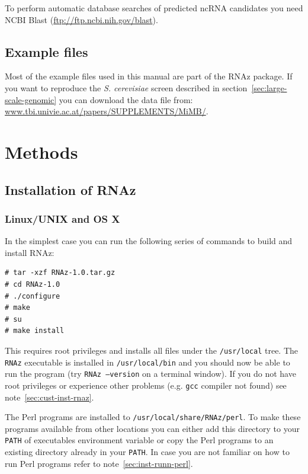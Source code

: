 \documentclass[11pt]{article}
\begin{document}
To perform automatic database searches of predicted ncRNA candidates you
need NCBI Blast (\url{ftp://ftp.ncbi.nih.gov/blast}).


\subsection{Example files}

Most of the example files used in this manual are part of the RNAz
package. If you want to reproduce the \emph{S. cerevisiae} screen described
in section~\ref{sec:large-scale-genomic} you can download the data file
from: \url{www.tbi.univie.ac.at/papers/SUPPLEMENTS/MiMB/}.

\section{Methods}

\subsection{Installation of RNAz}

\subsubsection{Linux/UNIX and OS X}

In the simplest case you can run the following series of commands to build
and install RNAz:

\begin{verbatim}
# tar -xzf RNAz-1.0.tar.gz
# cd RNAz-1.0 
# ./configure
# make
# su
# make install
\end{verbatim}

This requires root privileges and installs all files under the
\texttt{/usr/local} tree. The \texttt{RNAz} executable is installed in
\texttt{/usr/local/bin} and you should now be able to run the program (try
\texttt{RNAz --version} on a terminal window). If you do not have root
privileges or experience other problems (e.g. \texttt{gcc} compiler not
found) see note~\ref{sec:cust-inst-rnaz}.

The Perl programs are installed to \texttt{/usr/local/share/RNAz/perl}. To
make these programs available from other locations you can either add this
directory to your \texttt{PATH} of executables environment variable or copy
the Perl programs to an existing directory already in your \texttt{PATH}.
In case you are not familiar on how to run Perl programs refer to
note~\ref{sec:inst-runn-perl}.
\end{document}
